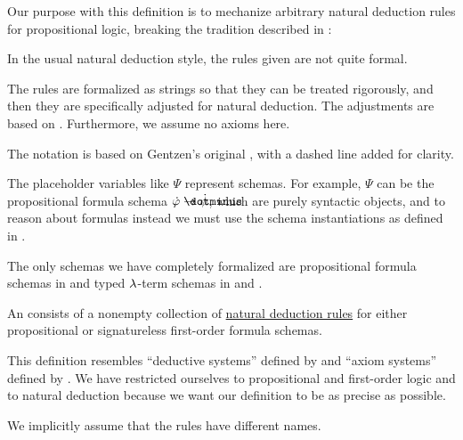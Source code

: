 \begin{comments}
  \item Our purpose with this definition is to mechanize arbitrary natural deduction rules for propositional logic, breaking the tradition described in \cite[13]{MartinLöf1984IntuitionisticTypeTheory}:
  \begin{displayquote}
    In the usual natural deduction style, the rules given are not quite formal.
  \end{displayquote}

  The rules are formalized as strings so that they can be treated rigorously, and then they are specifically adjusted for natural deduction. The adjustments are based on \cite[\S 2.1]{TroelstraSchwichtenberg2000BasicProofTheory}. Furthermore, we assume no axioms here.

  The notation is based on Gentzen's original \cite[186]{Gentzen1935LogischeSchließen}, with a dashed line added for clarity.

  \item The placeholder variables like \( \Psi \) represent schemas. For example, \( \Psi \) can be the propositional formula schema \( \syn\varphi \synimplies \syn\psi \), which are purely syntactic objects, and to reason about formulas instead we must use the schema instantiations as defined in .

  \item The only schemas we have completely formalized are propositional formula schemas in  and typed \( {\mathrm \lambda} \)-term schemas in  and .
\end{comments}

\begin{definition}\label{def:abstract_natural_deduction_system}\mimprovised
  An  consists of a nonempty collection of \hyperref[def:natural_deduction_rule]{natural deduction rules} for either propositional or signatureless first-order formula schemas.
\end{definition}
\begin{comments}
  \item This definition resembles \enquote{deductive systems} defined by  and \enquote{axiom systems} defined by . We have restricted ourselves to propositional and first-order logic and to natural deduction because we want our definition to be as precise as possible.
  \item We implicitly assume that the rules have different names.
\end{comments}

